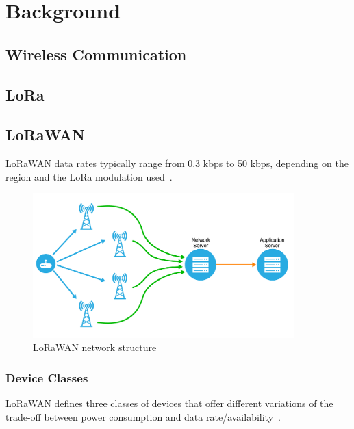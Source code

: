 \chapter{Background}

\section{Wireless Communication}
\section{\acf{LoRa}}


\section{\acf{LoRaWAN}}


\ac{LoRaWAN} data rates typically range from 0.3 kbps to 50 kbps, depending on the region and the \ac{LoRa} modulation used~\cite[p. 8]{lora_alliance_inc_lorawan_2017}.

\begin{figure}[ht]
    \centering
    \includegraphics[width=0.9\textwidth]{pictures/lorawan-structure/topology_semtech_developers.png}
    \caption{\ac{LoRaWAN} network structure~\protect\cite{semtech_lora_developer_portal_-depth_nodate}}
    \label{pic:lorawan-network-structure}
\end{figure}


\subsection{Device Classes}

\ac{LoRaWAN} defines three classes of devices that offer different variations of the trade-off between power consumption and data rate/availability~\cite[p. 10]{lora_alliance_inc_lorawan_2017}.

